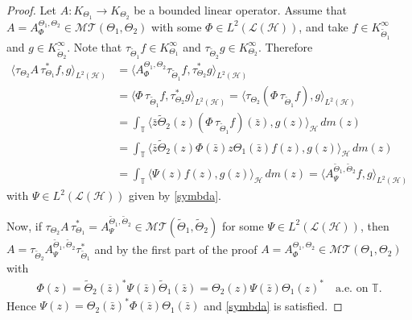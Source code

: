 \documentclass[11pt]{amsart}
\numberwithin{equation}{section}
\newcommand{\hsp}{\mathcal{H}}
\newcommand{\oL }{\mathcal{L}(\hsp) }
\theoremstyle{definition}
\numberwithin{equation}{section}
\begin{document}
\begin{proof}
	Let $A:K_{\Theta_1}\to K_{\Theta_2}$ be a bounded linear operator. Assume that $A=A_{\Phi}^{\Theta_{1}, \Theta_{2}}\in \mathcal{MT}(\Theta_{1}, \Theta_{2})$ with some $\Phi\in L^2(\oL)$, and take $f\in K_{\widetilde{\Theta}_1}^{\infty}$ and $g\in K_{\widetilde{\Theta}_2}^{\infty}$. Note that $\tau_{\widetilde{\Theta}_1}f\in K_{{\Theta}_1}^{\infty}$ and $\tau_{\widetilde{\Theta}_2}g\in K_{{\Theta}_2}^{\infty}$. Therefore
	\begin{align*}
	\langle \tau_{\Theta_2}A\,\tau_{\Theta_1}^{*}f,g \rangle_{L^2(\hsp)}&=\langle A_{\Phi}^{\Theta_{1}, \Theta_{2}}\tau_{\widetilde{\Theta}_1}f,\tau_{{\Theta}_2}^*g \rangle_{L^2(\hsp)}\\&=\langle {\Phi}\,\tau_{\widetilde{\Theta}_1}f,\tau_{{\Theta}_2}^*g \rangle_{L^2(\hsp)}=\langle \tau_{{\Theta}_2}({\Phi}\,\tau_{\widetilde{\Theta}_1}f),g \rangle_{L^2(\hsp)}\\
	&=\int_{\mathbb{T}}\langle \bar z\widetilde{\Theta}_2(z)({\Phi}\,\tau_{\widetilde{\Theta}_1}f)(\bar z),g(z) \rangle_{\hsp}\,dm(z)\\
	&=\int_{\mathbb{T}}\langle \bar z\widetilde{\Theta}_2(z){\Phi}(\bar z)z{\Theta}_1(\bar z)f( z),g(z) \rangle_{\hsp}\,dm(z)\\	
	&=\int_{\mathbb{T}}\langle  \Psi( z)f( z),g(z) \rangle_{\hsp}\,dm(z)=	\langle A_{\Psi}^{\widetilde{\Theta}_{1}, \widetilde{\Theta}_{2}}f,g \rangle_{L^2(\hsp)}
	\end{align*}
	with $\Psi\in L^2(\oL)$ given by \eqref{symbda}.
	
	Now, if $\tau_{\Theta_2}A\,\tau_{\Theta_1}^{*}=A_{\Psi}^{\widetilde{\Theta}_{1}, \widetilde{\Theta}_{2}}\in\mathcal{MT}(\widetilde{\Theta}_{1}, \widetilde{\Theta}_{2})$ for some $\Psi\in L^2(\oL)$, then  $A=\tau_{\widetilde{\Theta}_2}A_{\Psi}^{\widetilde{\Theta}_{1}, \widetilde{\Theta}_{2}}\tau_{\widetilde{\Theta}_1}^{*}$ and by the first part of the proof  $A=A_{\Phi}^{\Theta_{1}, \Theta_{2}}\in \mathcal{MT}(\Theta_{1}, \Theta_{2})$ with
	\begin{equation}\label{wykwyk}
	\begin{split}
	\Phi(z) =\widetilde{\Theta}_2(\bar z)^*\Psi(\bar z)\widetilde{\Theta}_1(\bar z)={\Theta}_2( z)\Psi(\bar z){\Theta}_1( z)^*\quad\text{a.e. on }\mathbb{T}.
	\end{split}
	\end{equation}
	Hence $\Psi( z)={\Theta}_2( \bar z)^*\Phi(\bar z){\Theta}_1( \bar z)$ and \eqref{symbda} is satisfied.
\end{proof}
\end{document}
